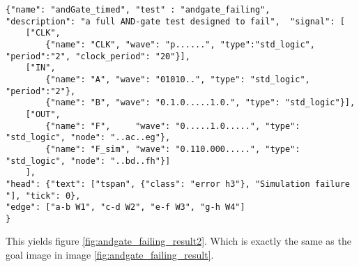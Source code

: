 \begin{lstlisting}[style=json, caption={Final content of the result file of a failing AND-gate example}, label={json:andgate_failing_result}]
{"name": "andGate_timed", "test" : "andgate_failing", 
"description": "a full AND-gate test designed to fail",  "signal": [
	["CLK",
		{"name": "CLK", "wave": "p......", "type":"std_logic", "period":"2", "clock_period": "20"}],
	["IN",
		{"name": "A", "wave": "01010..", "type": "std_logic", "period":"2"},
		{"name": "B", "wave": "0.1.0.....1.0.", "type": "std_logic"}],
	["OUT",
		{"name": "F",     "wave": "0.....1.0.....", "type": "std_logic", "node": "..ac..eg"},
		{"name": "F_sim", "wave": "0.110.000.....", "type": "std_logic", "node": "..bd..fh"}]
	], 
"head": {"text": ["tspan", {"class": "error h3"}, "Simulation failure "], "tick": 0}, 
"edge": ["a-b W1", "c-d W2", "e-f W3", "g-h W4"]
}
\end{lstlisting}\noindent
This yields figure \ref{fig:andgate_failing_result2}.
\nline
Which is exactly the same as the goal image in image \ref{fig:andgate_failing_result}.\newpage

